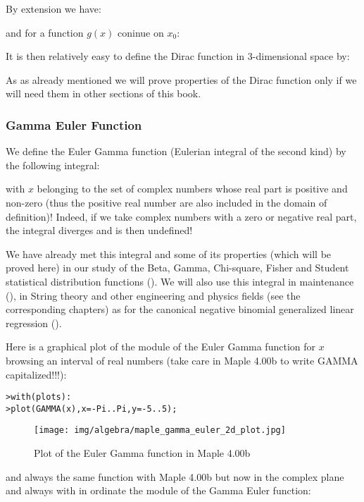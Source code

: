 	By extension we have:
	
	and for a function $g (x)$ coninue on $x_0$:
	
	It is then relatively easy to define the Dirac function in 3-dimensional space by:
	
	As as already mentioned we will prove properties of the Dirac function only if we will need them in other sections of this book.
	
	\subsubsection{Gamma Euler Function}\label{gamma euler function}
	We define the Euler Gamma function (Eulerian integral of the second kind) by the following integral:
	
	with $x$ belonging to the set of complex numbers whose real part is positive and non-zero (thus the positive real number are also included in the domain of definition)! Indeed, if we take complex numbers with a zero or negative real part, the integral diverges and is then undefined!
	
	\begin{tcolorbox}[title=Remark,colframe=black,arc=10pt]
		We have already met this integral and some of its properties (which will be proved here) in our study of the Beta, Gamma, Chi-square, Fisher and Student statistical distribution functions (). We will also use this integral in maintenance (), in String theory and other engineering and physics fields (see the corresponding chapters) as for the canonical negative binomial generalized linear regression ().
	\end{tcolorbox}
	
	Here is a graphical plot of the module of the Euler Gamma function for $x$ browsing an interval of real numbers (take care in Maple 4.00b to write GAMMA capitalized!!!):
	
	\texttt{>with(plots):\\}
	\texttt{>plot(GAMMA(x),x=-Pi..Pi,y=-5..5);}
	\begin{figure}[H]
		\centering
		\texttt{[image: img/algebra/maple\_gamma\_euler\_2d\_plot.jpg]}
		\caption{Plot of the Euler Gamma function in Maple 4.00b}
	\end{figure}
	and always the same function with Maple 4.00b but now in the complex plane and always with in ordinate the module of the Gamma Euler function:
	
